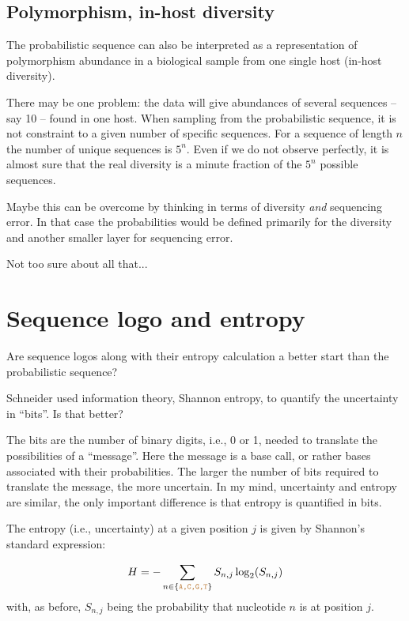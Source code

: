 \documentclass[12pt]{article}
\newcommand{\sq}[1]{\texttt{\textcolor{brown}{#1}}}
\begin{document}
\subsection{Polymorphism, in-host diversity}

The probabilistic sequence can also be interpreted as a representation of polymorphism abundance in a biological sample from one single host (in-host diversity).

There may be one problem: the data will give abundances of several sequences -- say 10 -- found in one host. 
When sampling from the probabilistic sequence, it is not constraint to a given number of specific sequences. For a sequence of length $n$ the number of  unique sequences is $5^n$. Even if we do not observe perfectly, it is almost sure that the real diversity is a minute fraction of the $5^n$ possible sequences.
 
Maybe this can be overcome by thinking in terms of diversity \emph{and} sequencing error.
In that case the probabilities would be defined primarily for the diversity and another smaller layer for sequencing error. 

Not too sure about all that... 



\section{Sequence logo and entropy}

Are sequence logos along with their entropy calculation a better start than the probabilistic sequence? 

Schneider \cite{Schneider:1986,schneider1990sequence,Schneider:2002} used information theory, Shannon entropy, to quantify the uncertainty in ``bits''. Is that better? 

The bits are the number of binary digits, i.e., 0 or 1, needed to translate the possibilities of a ``message''. Here the message is a base call, or rather bases associated with their probabilities. 
The larger the number of bits required to translate the message, the more uncertain. 
In my mind, uncertainty and entropy are similar, the only important difference is that entropy is quantified in bits. 

The entropy (i.e., uncertainty) at a given position $j$ is given by Shannon's standard expression:

\begin{equation}
H = -\sum_{n\in\{\sq{A,C,G,T}\}} S_{n,j}\log_2(S_{n,j})
\end{equation}
with, as before, $S_{n,j}$ being the probability that nucleotide $n$ is at position $j$.
\end{document}
